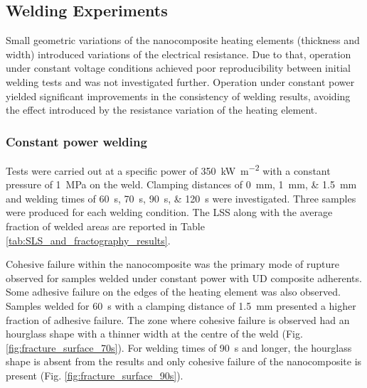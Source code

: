 \documentclass[11pt,review,times]{elsarticle}
\begin{document}
\FloatBarrier

\subsection{Welding Experiments}

Small geometric variations of the nanocomposite heating elements (thickness and width) introduced variations of the electrical resistance. 
Due to that, operation under constant voltage conditions achieved poor reproducibility between initial welding tests and was not investigated further. 
Operation under constant power yielded significant improvements in the consistency of welding results, avoiding the effect introduced by the resistance variation of the heating element. 

\subsubsection{Constant power welding}
\FloatBarrier

Tests were carried out at a specific power of \SI{350}{\kW\per\square\metre} with a constant pressure of \SI{1}{\MPa} on the weld. 
Clamping distances of \SIlist{0;1;1.5}{\mm} and welding times of \SIlist{60;70;90;120}{\s} were investigated. 
Three samples were produced for each welding condition. 
The LSS along with the average fraction of welded areas are reported in Table \ref{tab:SLS_and_fractography_results}. 

Cohesive failure within the nanocomposite was the primary mode of rupture observed for samples welded under constant power with UD composite adherents.
Some adhesive failure on the edges of the heating element was also observed. 
Samples welded for \SI{60}{\s} with a clamping distance of \SI{1.5}{\mm} presented a higher fraction of adhesive failure. 
The zone where cohesive failure is observed had an hourglass shape with a thinner width at the centre of the weld (Fig. \ref{fig:fracture_surface_70s}). 
For welding times of \SI{90}{\s} and longer, the hourglass shape is absent from the results and only cohesive failure of the nanocomposite is present (Fig. \ref{fig:fracture_surface_90s}). 
\end{document}
